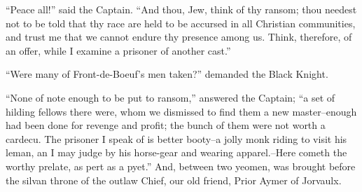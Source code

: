 ``Peace all!'' said the Captain. ``And thou, Jew, think of thy ransom;
thou needest not to be told that thy race are held to be accursed in all
Christian communities, and trust me that we cannot endure thy presence
among us. Think, therefore, of an offer, while I examine a prisoner of
another cast.''

``Were many of Front-de-Boeuf's men taken?'' demanded the Black Knight.

``None of note enough to be put to ransom,'' answered the Captain; ``a
set of hilding fellows there were, whom we dismissed to find them a new
master--enough had been done for revenge and profit; the bunch of them
were not worth a cardecu. The prisoner I speak of is better booty--a
jolly monk riding to visit his leman, an I may judge by his horse-gear
and wearing apparel.--Here cometh the worthy prelate, as pert as a
pyet.'' And, between two yeomen, was brought before the silvan throne of
the outlaw Chief, our old friend, Prior Aymer of Jorvaulx.
